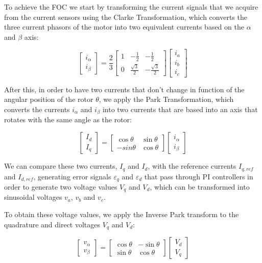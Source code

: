 To achieve the \ac{FOC} we start by transforming the current signals that we acquire from the current sensors using the Clarke Transformation, which converts the three current phasors of the motor into two equivalent currents based on the $\alpha$ and $\beta$ axis:

\[
\begin{bmatrix}
i_{\alpha}\\ 
i_{\beta}
\end{bmatrix}
=
\frac{2}{3}
\begin{bmatrix}
1 & -\frac{1}{2} & -\frac{1}{2}\\ 
0 & \frac{\sqrt{3}}{2} & -\frac{\sqrt{3}}{2}
\end{bmatrix}
\begin{bmatrix}
i_{a}\\
i_{b}\\
i_{c}
\end{bmatrix}
\]

After this, in order to have two currents that don't change in function of the angular position of the rotor $\theta$, we apply the Park Transformation, which converts the currents $i_{\alpha}$ and $i_{\beta}$ into two currents that are based into an axis that rotates with the same angle as the rotor:

\[
\begin{bmatrix}
I_{d}\\
I_{q}
\end{bmatrix}
=
\begin{bmatrix}
\cos \theta & \sin \theta \\ 
-sin \theta & \cos \theta
\end{bmatrix}
\begin{bmatrix}
i_{\alpha}\\
i_{\beta}
\end{bmatrix}
\]

We can compare these two currents, $I_{q}$ and $I_{d}$, with the reference currents $I_{q,ref}$ and $I_{d,ref}$, generating error signals $\varepsilon_{q}$ and $\varepsilon_{d}$ that pass through \ac{PI} controllers in order to generate two voltage values $V_{q}$ and $V_{d}$, which can be transformed into sinusoidal voltages $v_{a}$, $v_{b}$ and $v_{c}$.

To obtain these voltage values, we apply the Inverse Park transform to the quadrature and direct voltages $V_{q}$ and $V_{d}$:

\[
\begin{bmatrix}
v_{\alpha}\\
v_{\beta}
\end{bmatrix}
=
\begin{bmatrix}
\cos \theta & -\sin \theta \\ 
\sin \theta & \cos \theta
\end{bmatrix}
\begin{bmatrix}
V_{d}\\
V_{q}
\end{bmatrix}
\]


